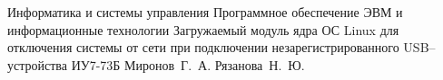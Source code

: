 \documentclass{bmstu}
\begin{document}
\makecourseworktitle
{Информатика и системы управления}
{Программное обеспечение ЭВМ и информационные технологии}
{Загружаемый модуль ядра ОС Linux для отключения системы от сети при подключении незарегистрированного USB--устройства}
{ИУ7-73Б}
{Миронов~Г.~А.}
{Рязанова~Н.~Ю.}
{}
{}
\setcounter{page}{3}



\maketableofcontents








\makebibliography


\end{document}
